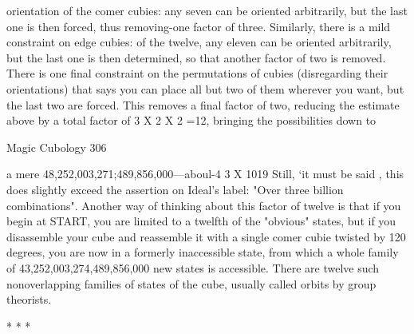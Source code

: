 orientation of the comer cubies: any seven can be oriented arbitrarily, but the last one
is then forced, thus removing-one factor of three. Similarly, there is a mild constraint
on edge cubies: of the twelve, any eleven can be oriented arbitrarily, but the last one is
then determined, so that another factor of two is removed. There is one final
constraint on the permutations of cubies (disregarding their orientations) that says you
can place all but two of them wherever you want, but the last two are forced. This
removes a final factor of two, reducing the estimate above by a total factor of 3 X 2 X
2 =12, bringing the possibilities down to




Magic Cubology                                                                        306

a mere 48,252,003,271;489,856,000---aboul-4 3 X 1019 Still, `it must be said , this
does slightly exceed the assertion on Ideal's label: "Over three billion combinations".
        Another way of thinking about this factor of twelve is that if you begin at
START, you are limited to a twelfth of the "obvious" states, but if you disassemble
your cube and reassemble it with a single comer cubie twisted by 120 degrees, you are
now in a formerly inaccessible state, from which a whole family of
43,252,003,274,489,856,000 new states is accessible. There are twelve such
nonoverlapping families of states of the cube, usually called orbits by group theorists.

                                       *   *   *

